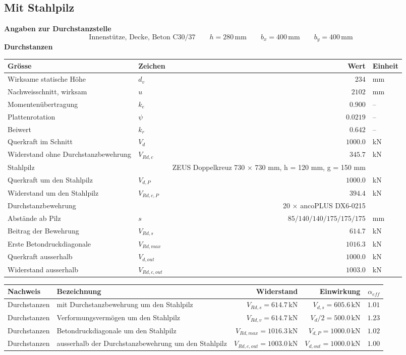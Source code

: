 \documentclass[11pt,a4paper]{article}
\begin{document}
\subsection{Mit Stahlpilz}
\noindent\textbf{Angaben zur Durchstanzstelle}
\begin{equation*}
\text{Innenstütze, Decke, Beton C30/37} \qquad h = 280\,\mathrm{mm} \qquad b_x = 400\,\mathrm{mm} \qquad b_y = 400\,\mathrm{mm}
\end{equation*}
\noindent\textbf{Durchstanzen}
\begin{longtable}{llrl}
\hline
Grösse & Zeichen & Wert & Einheit \\
\hline
\endhead
Wirksame statische Höhe & $d_v$ & $234$ & mm \\
Nachweisschnitt, wirksam & $u$ & $2102$ & mm \\
Momentenübertragung & $k_e$ & $0.900$ & – \\
Plattenrotation & $\psi$ & $0.0219$ & – \\
Beiwert & $k_r$ & $0.642$ & – \\
Querkraft im Schnitt & $V_d$ & $1000.0$ & kN \\
Widerstand ohne Durchstanzbewehrung & $V_{Rd,c}$ & $345.7$ & kN \\
Stahlpilz &  & ZEUS Doppelkreuz 730 × 730 mm, h = 120 mm, g = 150 mm &  \\
Querkraft um den Stahlpilz & $V_{d,P}$ & $1000.0$ & kN \\
Widerstand um den Stahlpilz & $V_{Rd,c,P}$ & $394.4$ & kN \\
Durchstanzbewehrung &  & 20 × ancoPLUS DX6-0215 &  \\
Abstände ab Pilz & $s$ & $85 / 140 / 140 / 175 / 175 / 175$ & mm \\
Beitrag der Bewehrung & $V_{Rd,s}$ & $614.7$ & kN \\
Erste Betondruckdiagonale & $V_{Rd,max}$ & $1016.3$ & kN \\
Querkraft ausserhalb & $V_{d,out}$ & $1000.0$ & kN \\
Widerstand ausserhalb & $V_{Rd,c,out}$ & $1003.0$ & kN \\
\hline
\end{longtable}
\begin{xltabular}{\linewidth}{>{\raggedright\arraybackslash}X>{\raggedright\arraybackslash}Xrrr}
\hline
Nachweis & Bezeichnung & Widerstand & Einwirkung & $\alpha_{eff}$ \\
\hline
\endhead
Durchstanzen & mit Durchstanzbewehrung um den Stahlpilz & $V_{Rd,s} = 614.7\,\mathrm{kN}$ & $V_{d,s} = 605.6\,\mathrm{kN}$ & $1.01$ \\
Durchstanzen & Verformungsvermögen um den Stahlpilz & $V_{Rd,v} = 614.7\,\mathrm{kN}$ & $V_d / 2 = 500.0\,\mathrm{kN}$ & $1.23$ \\
Durchstanzen & Betondruckdiagonale um den Stahlpilz & $V_{Rd,max} = 1016.3\,\mathrm{kN}$ & $V_{d,P} = 1000.0\,\mathrm{kN}$ & $1.02$ \\
Durchstanzen & ausserhalb der Durchstanzbewehrung um den Stahlpilz & $V_{Rd,c,out} = 1003.0\,\mathrm{kN}$ & $V_{d,out} = 1000.0\,\mathrm{kN}$ & $1.00$ \\
\hline
\end{xltabular}
\end{document}
